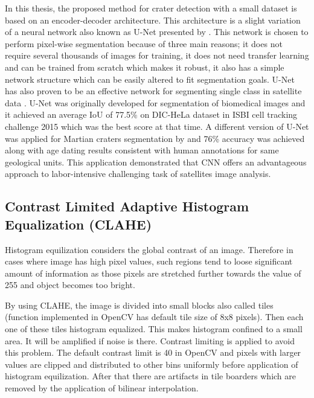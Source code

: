 \documentclass[11pt]{article}
\begin{document}
In this thesis, the proposed method for crater detection with a small dataset is based on an encoder-decoder architecture. This architecture is a slight variation of a neural network also known as U-Net presented by \cite{ronneberger2015u}. This network is chosen to perform pixel-wise segmentation because of three main reasons; it does not require several thousands of images for training, it does not need transfer learning and can be trained from scratch which makes it robust, it also has a simple network structure which can be easily altered to fit segmentation goals. U-Net has also proven to be an effective network for segmenting single class in satellite data \cite{Snuverink2017}. U-Net was originally developed for segmentation of biomedical images and it achieved an average IoU of 77.5\% on DIC-HeLa dataset in ISBI cell tracking challenge 2015 which was the best score at that time. A different version of U-Net was applied for Martian craters segmentation by \cite{delatte2019segmentation} and 76\% accuracy was achieved along with age dating results consistent with human annotations for same geological units. This application demonstrated that CNN offers an advantageous approach to labor-intensive challenging task of satellites image analysis. 

\subsection{Contrast Limited Adaptive Histogram Equalization (CLAHE)}
Histogram equilization considers the global contrast of an image. Therefore in cases where image has high pixel values, such regions tend to loose significant amount of information as those pixels are stretched further towards the value of 255 and object becomes too bright. 

By using CLAHE, the image is divided into small blocks also called tiles (function implemented in OpenCV has default tile size of 8x8 pixels). Then each one of these tiles histogram equalized. This makes histogram confined to a small area. It will be amplified if noise is there. Contrast limiting is applied to avoid this problem. The default contrast limit is 40 in OpenCV and pixels with larger values are clipped and distributed to other bins uniformly before application of histogram equilization. After that there are artifacts in tile boarders which are removed by the application of bilinear interpolation.
\end{document}
